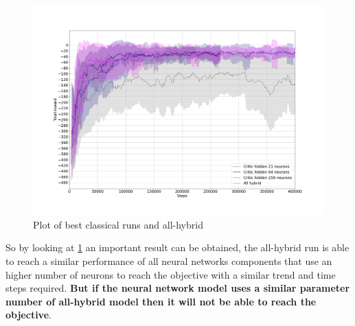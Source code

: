 \begin{figure}[H]
	\centering
	\includegraphics[width=0.9\linewidth]{"img/Best classical vs all hybrid results"}
	\caption{Plot of best classical runs and all-hybrid}
	\label{fig:best-classical-vs-all-hybrid-results}
\end{figure}
\newpage

So by looking at \ref{fig:best-classical-vs-all-hybrid-results} an important result can be obtained, the all-hybrid run is able to reach a similar performance of all neural networks components that use an higher number of neurons to reach the objective with a similar trend and time steps required. \textbf{But if the neural network model uses a similar parameter number of all-hybrid model then it will not be able to reach the objective}.

